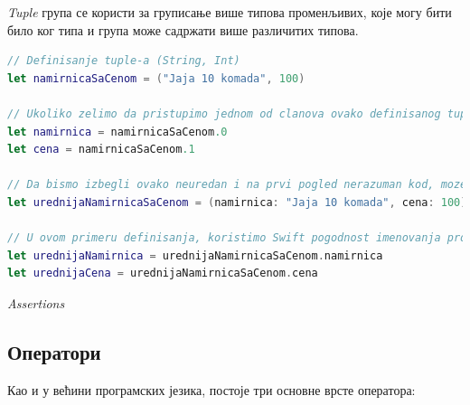 \documentclass[12pt,oneside]{memoir}
\begin{document}
\indent \textit{Tuple} група се користи за груписање више типова променљивих, које могу бити било ког типа и група може садржати више различитих типова.

\begin{lstlisting}[caption=\textit{{Tuple}}, label={lst:Tuple}, language=Swift, frame=single]
// Definisanje tuple-a (String, Int)
let namirnicaSaCenom = ("Jaja 10 komada", 100)

// Ukoliko zelimo da pristupimo jednom od clanova ovako definisanog tuple-a, mozemo uraditi na sledeci nacin:
let namirnica = namirnicaSaCenom.0
let cena = namirnicaSaCenom.1

// Da bismo izbegli ovako neuredan i na prvi pogled nerazuman kod, mozemo koristiti drugaciju sinatksu za definisanje tuple-a
let urednijaNamirnicaSaCenom = (namirnica: "Jaja 10 komada", cena: 100)

// U ovom primeru definisanja, koristimo Swift pogodnost imenovanja promenljivih unutar tuple-a, kojima sada mozemo pristupiti:
let urednijaNamirnica = urednijaNamirnicaSaCenom.namirnica
let urednijaCena = urednijaNamirnicaSaCenom.cena
\end{lstlisting}

\indent \textit{Assertions} %

\subsection{Оператори}

\indent Као и у већини програмских језика, постоје три основне врсте оператора: 
\end{document}
